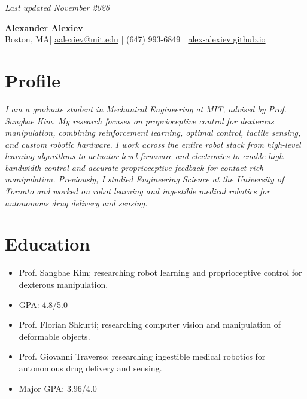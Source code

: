 
\begin{flushright}
  {\footnotesize\color{cvgray}\textit{Last updated November 2026}}
\end{flushright}
\vspace{-1.4em}

\begin{center}
  {\fontsize{28}{32}\selectfont\bfseries\color{cvblue}Alexander Alexiev}\\[7pt]
  \small
  Boston, MA\quad\textcolor{cvgray}{|}\quad
  \href{mailto:aalexiev@mit.edu}{aalexiev@mit.edu} \quad\textcolor{cvgray}{|}\quad
  (647) 993-6849 \quad\textcolor{cvgray}{|}\quad
  \href{https://alex-alexiev.github.io}{alex-alexiev.github.io}
\end{center}
\vspace{-0.4em}

\section{Profile}
{\itshape
I am a graduate student in Mechanical Engineering at MIT, advised by Prof. Sangbae Kim.
My research focuses on proprioceptive control for dexterous manipulation, combining
reinforcement learning, optimal control, tactile sensing, and custom robotic hardware. I work across
the entire robot stack from high-level learning algorithms to actuator level firmware and electronics
to enable high bandwidth control and accurate proprioceptive feedback for contact-rich manipulation.
Previously, I studied Engineering Science at the University of Toronto and worked on
robot learning and ingestible medical robotics for autonomous drug delivery and sensing.
\par}

\section{Education}
\begin{itemize}
  \item Prof. Sangbae Kim; researching robot learning and proprioceptive control for dexterous manipulation.
  \item GPA: 4.8/5.0
\end{itemize}
\begin{itemize}
  \item Prof. Florian Shkurti; researching computer vision and manipulation of deformable objects.
  \item Prof. Giovanni Traverso; researching ingestible medical robotics for autonomous drug delivery and sensing.
  \item Major GPA: 3.96/4.0
\end{itemize}

